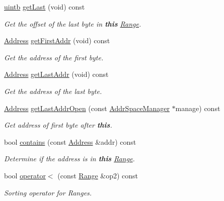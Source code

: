 \begin{DoxyCompactItemize}
\mbox{\hyperlink{types_8h_a2db313c5d32a12b01d26ac9b3bca178f}{uintb}} \mbox{\hyperlink{class_range_afbcec6b1a5499f299dc8ff7d078cd83c}{get\+Last}} (void) const
\begin{DoxyCompactList}\small\item\em Get the offset of the last byte in {\bfseries{this}} \mbox{\hyperlink{class_range}{Range}}. \end{DoxyCompactList}\item 
\mbox{\hyperlink{class_address}{Address}} \mbox{\hyperlink{class_range_abdedc039293f93e7687ecb43a21cdf38}{get\+First\+Addr}} (void) const
\begin{DoxyCompactList}\small\item\em Get the address of the first byte. \end{DoxyCompactList}\item 
\mbox{\hyperlink{class_address}{Address}} \mbox{\hyperlink{class_range_a1fdc16eafa7a33a122ad682822c7d7d1}{get\+Last\+Addr}} (void) const
\begin{DoxyCompactList}\small\item\em Get the address of the last byte. \end{DoxyCompactList}\item 
\mbox{\hyperlink{class_address}{Address}} \mbox{\hyperlink{class_range_af5cc1b4a92034ab87269b25950f0fe8f}{get\+Last\+Addr\+Open}} (const \mbox{\hyperlink{class_addr_space_manager}{Addr\+Space\+Manager}} $\ast$manage) const
\begin{DoxyCompactList}\small\item\em Get address of first byte after {\bfseries{this}}. \end{DoxyCompactList}\item 
bool \mbox{\hyperlink{class_range_a88b49f65bc500d33d15941f053db4e11}{contains}} (const \mbox{\hyperlink{class_address}{Address}} \&addr) const
\begin{DoxyCompactList}\small\item\em Determine if the address is in {\bfseries{this}} \mbox{\hyperlink{class_range}{Range}}. \end{DoxyCompactList}\item 
bool \mbox{\hyperlink{class_range_af79209e97d5e8df1e26846b478722909}{operator$<$}} (const \mbox{\hyperlink{class_range}{Range}} \&op2) const
\begin{DoxyCompactList}\small\item\em Sorting operator for Ranges. \end{DoxyCompactList}\item 

\end{DoxyCompactItemize}
